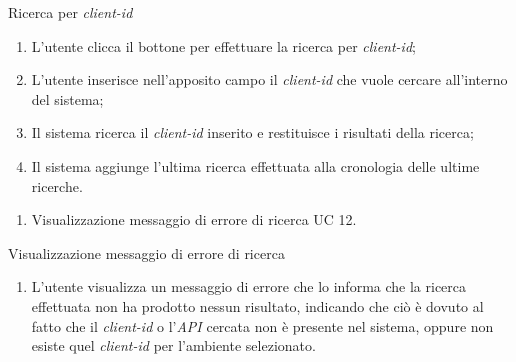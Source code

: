 \begin{usecase}{11}{Ricerca per \textit{client-id}}\label{uc:ricerca-client-id}

    \usecasemain{}
        \begin{enumerate}
            \item L'utente clicca il bottone per effettuare la ricerca per \textit{client-id};
            \item L'utente inserisce nell'apposito campo il \textit{client-id} che vuole cercare all'interno del sistema;
            \item Il sistema ricerca il \textit{client-id} inserito e restituisce i risultati della ricerca;
            \item Il sistema aggiunge l'ultima ricerca effettuata alla cronologia delle ultime ricerche.
        \end{enumerate}

    \usecaseext{}
        \begin{enumerate}
            \item Visualizzazione messaggio di errore di ricerca UC 12.
        \end{enumerate}

\end{usecase}


\begin{usecase}{12}{Visualizzazione messaggio di errore di ricerca}\label{uc:visualizzazione-errore-ricerca}

    \usecasemain{}
        \begin{enumerate}
            \item L'utente visualizza un messaggio di errore che lo informa che la ricerca effettuata non ha prodotto nessun risultato, indicando che ciò è dovuto al fatto
            che il \textit{client-id} o l'\textit{API} cercata non è presente nel sistema, oppure non esiste quel \textit{client-id} per l'ambiente selezionato.
        \end{enumerate}

\end{usecase}

